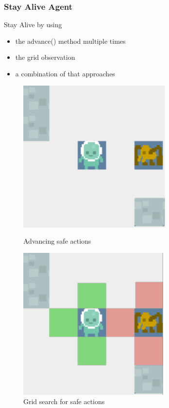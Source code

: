 \documentclass{beamer}
\begin{document}
\begin{frame}
\frametitle{Stay Alive Agent}
Stay Alive by using
\begin{itemize}
\item the advance() method multiple times
\item the grid observation
\item a combination of that approaches
\end{itemize}

\begin{figure}
\centering
\begin{minipage}{.5\textwidth}
  \centering
\includegraphics[scale=0.8]{../report/images/safe.pdf}
\caption{Advancing safe actions}
\label{fig:safe}
\end{minipage}%
\begin{minipage}{.5\textwidth}
\centering
\includegraphics[scale=0.8]{../report/images/safe_grid.pdf}
\caption{Grid search for safe actions}
\label{fig:safe_grid}
\end{minipage}
\end{figure}



\end{frame}
\end{document}
